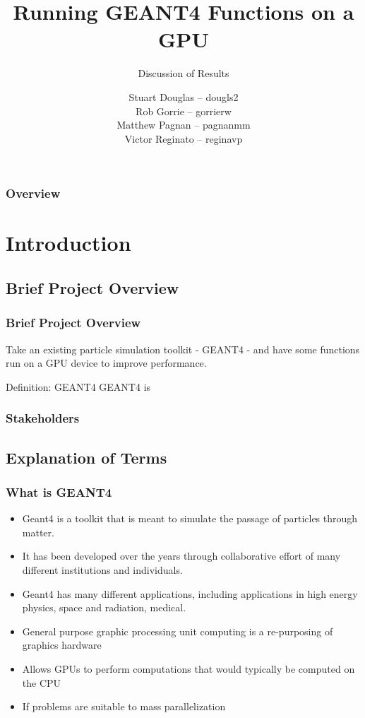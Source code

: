 \documentclass{beamer}
\title[GEANT4-GPU (McMaster University)]{Running GEANT4 Functions on a GPU}
\subtitle{Discussion of Results}
\institute{McMaster University}
\author[S. Douglas, R. Gorrie, M .Pagnan, V. Reginato]{
Stuart Douglas -- dougls2
\\Rob Gorrie -- gorrierw
\\Matthew Pagnan -- pagnanmm
\\Victor Reginato -- reginavp
}
\begin{document}
\frame{\titlepage}
\begin{frame}
\frametitle{Overview}
\tableofcontents
\end{frame}

\section{Introduction} 

\subsection{Brief Project Overview}
\begin{frame}
\frametitle{Brief Project Overview}
Take an existing particle simulation toolkit - GEANT4 - and have some functions run on a GPU device to improve performance.
\begin{block}{Definition: GEANT4}
GEANT4 is 
\end{block}
\end{frame}

\begin{frame}
\frametitle{Stakeholders}
\end{frame}

\subsection{Explanation of Terms}
\begin{frame}
\frametitle{What is GEANT4}
\begin{itemize}
\item Geant4 is a toolkit that is meant to simulate the passage of particles through matter. 
\item It has been developed over the years through collaborative effort of many different institutions and individuals. 
\item Geant4 has many different applications, including applications in high energy physics, space and radiation, medical. 
\end{itemize}
\end{frame}

\begin{frame}
\begin{itemize}
\frametitle{What is GP-GPU}
\item General purpose graphic processing unit computing is a re-purposing of graphics hardware
\item Allows GPUs  to perform computations that would typically be computed on the CPU
\item If problems are suitable to mass parallelization 
\end{itemize}
\end{frame}
\end{document}
